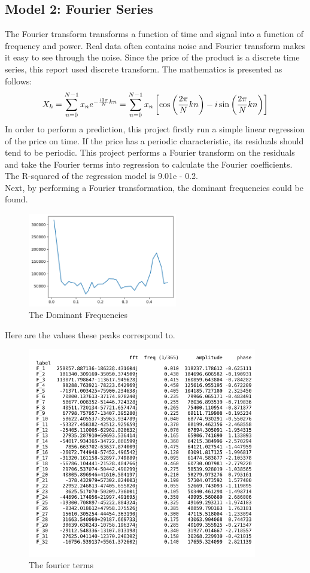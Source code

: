 \documentclass{article}
\begin{document}
\subsection*{Model 2: Fourier Series}
The Fourier transform transforms a function of time and signal into a function of frequency and power. Real data often contains noise and Fourier transform makes it easy to see through the noise. Since the price of the product is a discrete time series, this report used discrete transform. The mathematics is presented as follows:
\begin{equation}
	X_{k} = \sum_{n=0}^{N-1}x_{n}e^{-\frac{i2\pi}{N}kn} \\
		  = \sum_{n=0}^{N-1}x_{n}\left[\cos\left(\frac{2\pi}{N}kn\right)-i\sin\left(\frac{2\pi}{N}kn\right)\right]
\end{equation}
In order to perform a prediction, this project firstly run a simple linear regression of the price on time. If the price has a periodic characteristic, its residuals should tend to be periodic. This project performs a Fourier transform on the residuals and take the Fourier terms into regression to calculate the Fourier coefficients.
The R-squared of the regression model is 9.01e - 0.2.\\
Next, by performing a Fourier transformation, the dominant frequencies could be found.
\begin{figure}[htbp]\centering
	\includegraphics[width=6.5cm]{Fourier_Freq.png}
	\caption{The Dominant Frequencies}
	\label{fig: Fourier Transform}
\end{figure}
Here are the values these peaks correspond to.\\
\begin{figure}[htbp]\centering
	\includegraphics[width=10cm]{Fourier_terms.png}
	\caption{The fourier terms}
	\label{fig: Fourier Transform}
\end{figure}
\end{document}
